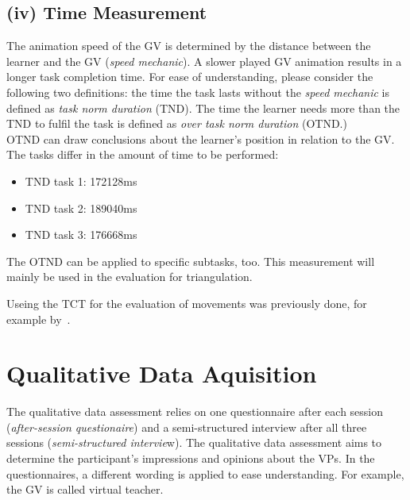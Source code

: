 \subsection{(iv) Time Measurement}
The animation speed of the GV is determined by the distance between the learner and the GV (\textit{speed mechanic}). A slower played GV animation results in a longer task completion time. For ease of understanding, please consider the following two definitions: the time the task lasts without the \textit{speed mechanic} is defined as \textit{task norm duration} (TND). The time the learner needs more than the TND to fulfil the task is defined as \textit{over task norm duration} (OTND.)\\
OTND can draw conclusions about the learner's position in relation to the GV.
The tasks differ in the amount of time to be performed:
\begin{itemize}
	\item TND task 1: 172128ms
	\item TND task 2: 189040ms
	\item TND task 3: 176668ms
\end{itemize}
The OTND can be applied to specific subtasks, too. This measurement will mainly be used in the evaluation for triangulation.

Useing the TCT for the evaluation of movements was previously done, for example by~\cite{onebody,YouMove,perspectivematters}.

\section{Qualitative Data Aquisition}
\label{sec:quali_logging}
The qualitative data assessment relies on one questionnaire after each session (\textit{after-session questionaire}) and a semi-structured interview after all three sessions (\textit{semi-structured intervie}w). The qualitative data assessment aims to determine the participant's impressions and opinions about the VPs. In the questionnaires, a different wording is applied to ease understanding. For example, the GV is called virtual teacher. 

